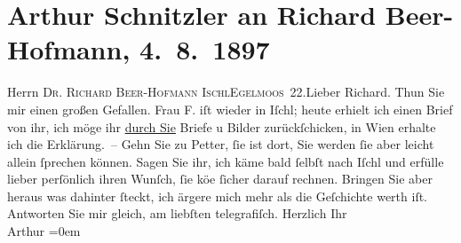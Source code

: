 

         
         \renewcommand{\erwaehntePersonen}{Personen: Richard Beer-Hofmann, Rosa Freudenthal}
         \renewcommand{\erwaehnteOrte}{Orte: Bad Ischl, Eglmoosgasse, Hotel und Pension Rudolfshöhe (Leopold Petter), IX., Alsergrund, Wien}
         \renewcommand{\erwaehnteWerke}{}
               \section[Arthur Schnitzler an Richard Beer-Hofmann, 4. 8. 1897]{ Arthur Schnitzler an Richard Beer-Hofmann, 4. 8. 1897}\nopagebreak{}\rehead{ }\begin{ledgroupsized}[t]{13cm}\normalsize\beginnumbering \toendnotes[C]{\smallbreak\pagebreak[2]} 
\toendnotes[C]{\smallbreak}\pstart{}{\pb}Herrn \textsc{Dr. Richard
                     Beer-Hofmann }\pend{}\pstart{}\textsc{Ischl}\pend{}\pstart{}\textsc{Egelmoos 22}.\pend{}{\bigskip}\pstart{}{\pb}Lieber Richard.\pend\pstart
           Thun Sie mir einen großen Gefallen.\pend
           \pstart
           Frau F. iſt wieder in Iſchl; heute erhielt ich einen Brief von ihr, ich möge ihr \uline{durch Sie} Briefe u Bilder zurückſchicken, in Wien erhalte ich die Erklärung. – Gehn Sie zu {\pb}Petter, ſie ist \label{K_L00712_1v}\label{K_L00712_1h} dort, Sie werden ſie aber leicht allein ſprechen können. Sagen Sie
               ihr, ich käme bald ſelbſt nach Iſchl und erfülle
               lieber perſönlich ihren Wunſch, ſie kö{\geminationn}e ſicher darauf
               rechnen. {\pb}Bringen Sie aber heraus was dahinter ſteckt,
               ich ärgere mich mehr als die Geſchichte werth iſt. Antworten Sie mir gleich, am
               liebſten telegrafiſch.\pend
           \pstart
           Herzlich Ihr{\\[\baselineskip]}\spacefill\mbox{Arthur}\pend
           \leftskip=0em{}
         
         \endnumbering{}\end{ledgroupsized}  \newcommand{\dateiname}{L00712}\newcommand{\titel}{Arthur Schnitzler an Richard Beer-Hofmann, 4. 8. 1897}\newcommand{\editorInnen}{Martin Anton Müller und Gerd-Hermann Susen}
      